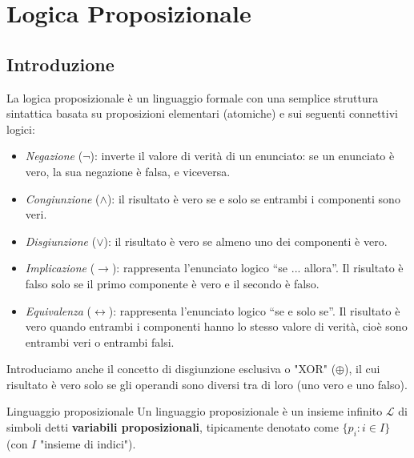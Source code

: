 \documentclass[a4paper,11pt]{report}
\begin{document}
\makefrontpage

\tableofcontents

\chapter{Logica Proposizionale}

\section{Introduzione}

La logica proposizionale è un linguaggio formale con una semplice struttura sintattica basata su proposizioni elementari (atomiche) e sui seguenti connettivi logici:


\begin{itemize}
    \item \textit{Negazione} ($\neg$): inverte il valore di verità di un enunciato: se un enunciato è vero, la sua negazione è falsa, e viceversa.
    
    \item \textit{Congiunzione} ($\land$): il risultato è vero se e solo se entrambi i componenti sono veri.
    
    \item \textit{Disgiunzione} ($\lor$): il risultato è vero se almeno uno dei componenti è vero.
    
    \item \textit{Implicazione} ($\to$): rappresenta l’enunciato logico “se ... allora”. Il risultato è falso solo se il primo componente è vero e il secondo è falso. 
    
    \item \textit{Equivalenza} ($\leftrightarrow$): rappresenta l’enunciato logico “se e solo se”. 
    Il risultato è vero quando entrambi i componenti hanno lo stesso valore di verità, cioè sono entrambi veri o entrambi falsi.
\end{itemize}

Introduciamo anche il concetto di disgiunzione esclusiva o "XOR" (\( \oplus \)), il cui risultato è vero solo se gli operandi sono diversi tra di loro (uno vero e uno falso).

\begin{defbox}{Linguaggio proposizionale}{}
    Un linguaggio proposizionale è un insieme infinito \( \mathcal{L} \) di simboli detti \textbf{variabili proposizionali}, tipicamente denotato come \( \{p_i : i \in I\} \) {\color{gray} (con \( I \) "insieme di indici")}.
\end{defbox}
\end{document}
